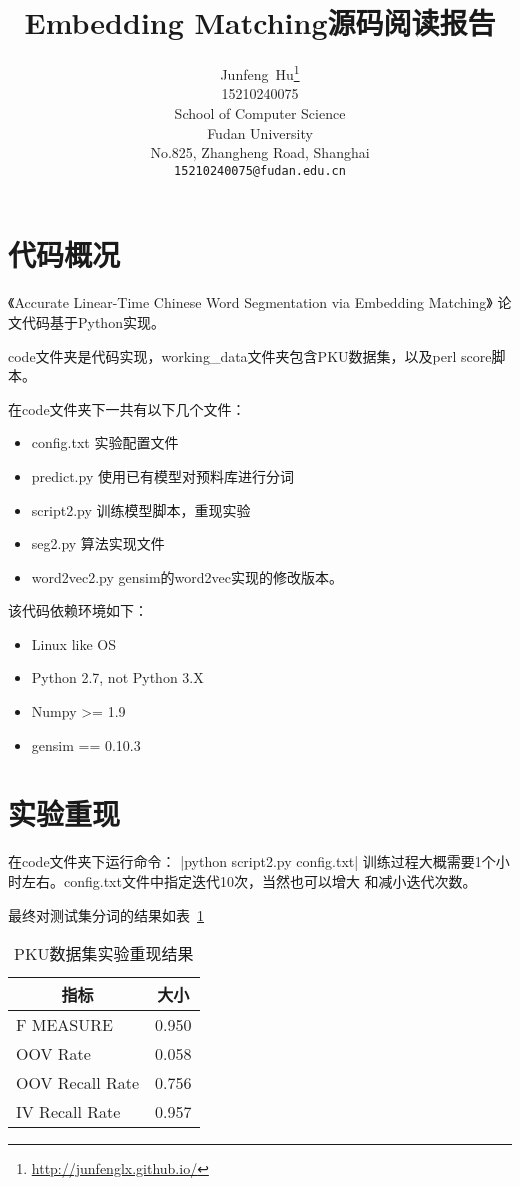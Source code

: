 \documentclass[]{article}
\title{Embedding Matching源码阅读报告}
\author{
	Junfeng~Hu\thanks{ \url{http://junfenglx.github.io/}} \\
	15210240075 \\
	School of Computer Science\\
	Fudan University\\
	No.825, Zhangheng Road, Shanghai \\
	\texttt{15210240075@fudan.edu.cn} \\
}
\begin{document}
\maketitle



\tableofcontents

\section{代码概况}
《Accurate Linear-Time Chinese Word Segmentation via Embedding Matching》
论文代码基于Python实现。

code文件夹是代码实现，working\_data文件夹包含PKU数据集，以及perl score脚本。

在code文件夹下一共有以下几个文件：
\begin{itemize}
\item config.txt 实验配置文件
\item predict.py 使用已有模型对预料库进行分词
\item script2.py 训练模型脚本，重现实验
\item seg2.py 算法实现文件
\item word2vec2.py gensim的word2vec实现的修改版本。
\end{itemize}

该代码依赖环境如下：
\begin{itemize}
\item Linux like OS
\item Python 2.7, not Python 3.X
\item Numpy >= 1.9
\item gensim == 0.10.3
\end{itemize}

\section{实验重现}
在code文件夹下运行命令： |python script2.py config.txt|
训练过程大概需要1个小时左右。config.txt文件中指定迭代10次，当然也可以增大
和减小迭代次数。

最终对测试集分词的结果如表~\ref{tab:pku_experiment_result}
\begin{table}[t]
\caption{PKU数据集实验重现结果}
\label{tab:pku_experiment_result}
\begin{center}
\begin{tabular}{ll}
\multicolumn{1}{c}{\bf  指标} & \multicolumn{1}{c}{\bf 大小} \\ \hline
F MEASURE &0.950 \\
OOV Rate  &0.058 \\
OOV Recall Rate    &0.756 \\
IV Recall Rate &0.957 \\
\end{tabular}
\end{center}
\end{table}
\end{document}
